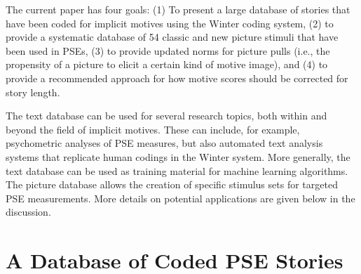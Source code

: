 \documentclass[jou,a4paper]{apa6}\usepackage[]{graphicx}\usepackage[]{color}
\begin{document}
The current paper has four goals: (1) To present a large database of stories that have been coded for implicit motives using the Winter coding system, (2) to provide a systematic database of 54 classic and new picture stimuli that have been used in PSEs, (3) to provide updated norms for picture pulls (i.e., the propensity of a picture to elicit a certain kind of motive image), and (4) to provide a recommended approach for how motive scores should be corrected for story length.

The text database can be used for several research topics, both within and beyond the field of implicit motives. These can include, for example, psychometric analyses of PSE measures, but also automated text analysis systems that replicate human codings in the Winter system. More generally, the text database can be used as training material for machine learning algorithms. The picture database allows the creation of specific stimulus sets for targeted PSE measurements. More details on potential applications are given below in the discussion.


\section{A Database of Coded PSE Stories}
\end{document}
